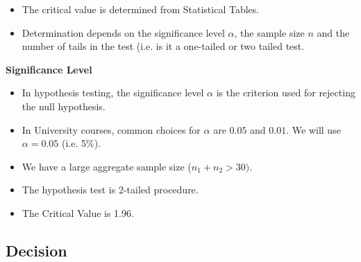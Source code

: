 \documentclass[a4paper,12pt]{article}
\begin{document}
\begin{itemize}
\item The critical value is determined from Statistical Tables.
\item Determination depends on the significance level $\alpha$, the sample size $n$ and the number of tails in the test (i.e. is it a one-tailed or two tailed test.
\end{itemize}

\noindent \textbf{Significance Level}

\begin{itemize}
\item In hypothesis testing, the significance level $\alpha$ is the criterion used for rejecting the null hypothesis. 

\item In University courses, common choices for $\alpha$ are $0.05$ and $0.01$. We will use $\alpha =0.05$ (i.e. 5\%).
\item We have a large aggregate sample size ($n_1 + n_2 > 30)$.
\item The hypothesis test is 2-tailed procedure.
\item The Critical Value is 1.96.
\end{itemize}



\newpage 
\subsection*{Decision}
\end{document}
